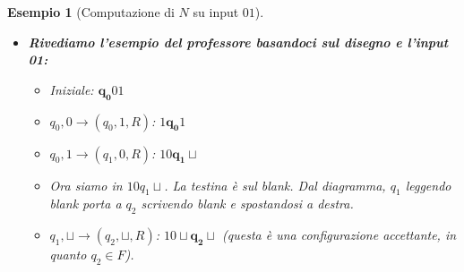 \documentclass[a4paper]{article}
\newtheorem{example}{Esempio}
\begin{document}
\begin{example}[Computazione di $N$ su input $01$]
\begin{enumerate}
    \begin{itemize}
        \item \textbf{Rivediamo l'esempio del professore basandoci sul disegno e l'input 01:}
        \begin{itemize}
            \item Iniziale: $\mathbf{q_0}01$
            \item $q_0,0 \to (q_0,1,R)$: $1\mathbf{q_0}1$
            \item $q_0,1 \to (q_1,0,R)$: $10\mathbf{q_1}\sqcup$
            \item Ora siamo in $10q_1\sqcup$. La testina è sul blank. Dal diagramma, $q_1$ leggendo blank porta a $q_2$ scrivendo blank e spostandosi a destra.
            \item $q_1,\sqcup \to (q_2,\sqcup,R)$: $10\sqcup\mathbf{q_2}\sqcup$ (questa è una configurazione accettante, in quanto $q_2 \in F$).
        \end{itemize}
        

\end{itemize}
\end{enumerate}
\end{example}
\end{document}
